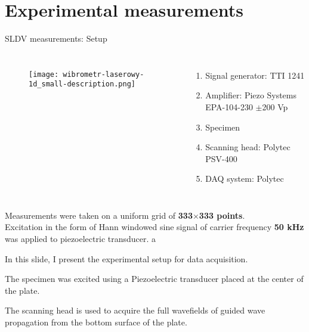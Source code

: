 \documentclass[10pt,aspectratio=169,dvipsnames]{beamer} %
\begin{document}
	\section*{Experimental measurements}
	\begin{frame}[t]{SLDV measurements: Setup}
		\begin{columns}[T]
			\begin{figure}
				\texttt{[image: wibrometr-laserowy-1d\_small-description.png]}
			\end{figure}
			\begin{enumerate}
				\item Signal generator: TTI 1241 
				\item Amplifier: Piezo Systems EPA-104-230 $\pm$200 Vp
				\item Specimen
				\item Scanning head: Polytec PSV-400
				\item DAQ system: Polytec
			\end{enumerate}
		\end{columns}
		{\small
			Measurements were taken on a uniform grid of \textbf{333$\times$333 points}.\\
			Excitation in the form of Hann windowed sine signal of carrier frequency \textbf{50 kHz} was applied to piezoelectric transducer.}
a	\end{frame}
	\note
	{
		In this slide, I present the experimental setup for data acquisition.
		
		The specimen was excited using a Piezoelectric transducer placed at the center of the plate.
		
		The scanning head is used to acquire the full wavefields of guided wave propagation from the bottom surface of the plate.	
	}
\end{document}
